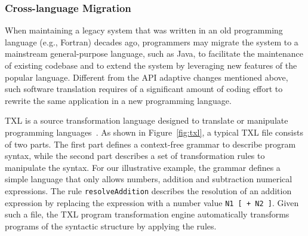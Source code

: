 \documentclass[runningheads,a4paper]{llncs}
\newcommand{\codefont}[1]{\footnotesize{\texttt{#1}}\normalsize}
\begin{document}
\subsubsection{Cross-language Migration} 
When maintaining a legacy system that was written in an old programming language (e.g., Fortran) decades ago, programmers may migrate the system to a mainstream general-purpose language, such as Java, to facilitate the maintenance of existing codebase and to extend the system by leveraging new features of the popular language. Different from the API adaptive changes mentioned above, such software translation requires of a significant amount of coding effort to rewrite the same application in a new programming language.


TXL is a source transformation language designed to translate or manipulate programming languages~\cite{Cordy2006}. As shown in Figure~\ref{fig:txl}, a typical TXL file consists of two parts. The first part defines a context-free grammar to describe program syntax, while the second part describes a set of transformation rules to manipulate the syntax. For our illustrative example, the grammar defines a simple language that only allows numbers, addition and subtraction numerical expressions. The rule \codefont{resolveAddition} describes the resolution of an addition expression by replacing the expression with a number value \codefont{N1 [ + N2 ]}. Given such a file, the TXL program transformation engine automatically transforms programs of the syntactic structure by applying the rules. 
\end{document}
